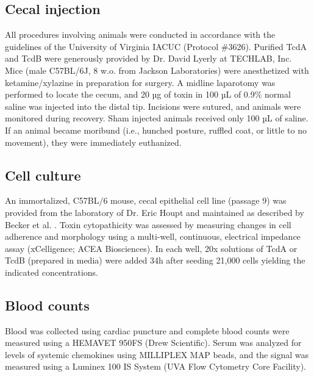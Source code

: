 \subsection{ Cecal injection }
All procedures involving animals were conducted in accordance with the guidelines of the University of Virginia IACUC (Protocol \#3626). Purified TcdA and TcdB were generously provided by Dr. David Lyerly at TECHLAB, Inc. Mice (male C57BL/6J, 8 w.o. from Jackson Laboratories) were anesthetized with ketamine/xylazine in preparation for surgery. A midline laparotomy was performed to locate the cecum, and 20 µg of toxin in 100 µL of 0.9\% normal saline was injected into the distal tip. Incisions were sutured, and animals were monitored during recovery. Sham injected animals received only 100 µL of saline. If an animal became moribund (i.e., hunched posture, ruffled coat, or little to no movement), they were immediately euthanized. 

\subsection{ Cell culture }
An immortalized, C57BL/6 mouse, cecal epithelial cell line (passage 9) was provided from the laboratory of Dr. Eric Houpt and maintained as described by Becker et al. \cite{Becker:2010io}. Toxin cytopathicity was assessed by measuring changes in cell adherence and morphology using a multi-well, continuous, electrical impedance assay (xCelligence; ACEA Biosciences). In each well, 20x solutions of TcdA or TcdB (prepared in media) were added 34h after seeding 21,000 cells yielding the indicated concentrations.

\subsection{ Blood counts }
Blood was collected using cardiac puncture and complete blood counts were measured using a HEMAVET 950FS (Drew Scientific). Serum was analyzed for levels of systemic chemokines using MILLIPLEX MAP beads, and the signal was measured using a Luminex 100 IS System (UVA Flow Cytometry Core Facility).

